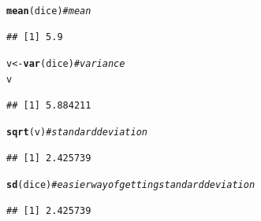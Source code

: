 \documentclass[12pt]{article}\usepackage[]{graphicx}\usepackage[]{color}
\makeatletter
\newcommand{\hlcom}[1]{\textcolor[rgb]{0.678,0.584,0.686}{\textit{#1}}}%
\newcommand{\hlstd}[1]{\textcolor[rgb]{0.345,0.345,0.345}{#1}}%
\newcommand{\hlkwb}[1]{\textcolor[rgb]{0.69,0.353,0.396}{#1}}%
\newcommand{\hlkwd}[1]{\textcolor[rgb]{0.737,0.353,0.396}{\textbf{#1}}}%
\newenvironment{kframe}{%
 \def\at@end@of@kframe{}%
 \ifinner\ifhmode%
  \def\at@end@of@kframe{\end{minipage}}%
  \begin{minipage}{\columnwidth}%
 \fi\fi%
 \def\FrameCommand##1{\hskip\@totalleftmargin \hskip-\fboxsep
 \colorbox{shadecolor}{##1}\hskip-\fboxsep
     \hskip-\linewidth \hskip-\@totalleftmargin \hskip\columnwidth}%
 \MakeFramed {\advance\hsize-\width
   \@totalleftmargin\z@ \linewidth\hsize
   \@setminipage}}%
 {\par\unskip\endMakeFramed%
 \at@end@of@kframe}
\newenvironment{knitrout}{}{} %
\makeatother
\begin{document}
\begin{knitrout}
\begin{kframe}
\begin{alltt}
\hlkwd{mean}\hlstd{(dice)} \hlcom{#mean}
\end{alltt}
\begin{verbatim}
## [1] 5.9
\end{verbatim}
\begin{alltt}
\hlstd{v} \hlkwb{<-} \hlkwd{var}\hlstd{(dice)} \hlcom{#variance}
\hlstd{v}
\end{alltt}
\begin{verbatim}
## [1] 5.884211
\end{verbatim}
\begin{alltt}
\hlkwd{sqrt}\hlstd{(v)} \hlcom{#standard deviation}
\end{alltt}
\begin{verbatim}
## [1] 2.425739
\end{verbatim}
\begin{alltt}
\hlkwd{sd}\hlstd{(dice)} \hlcom{#easier way of getting standard deviation}
\end{alltt}
\begin{verbatim}
## [1] 2.425739
\end{verbatim}
\end{kframe}
\end{knitrout}
\end{document}
